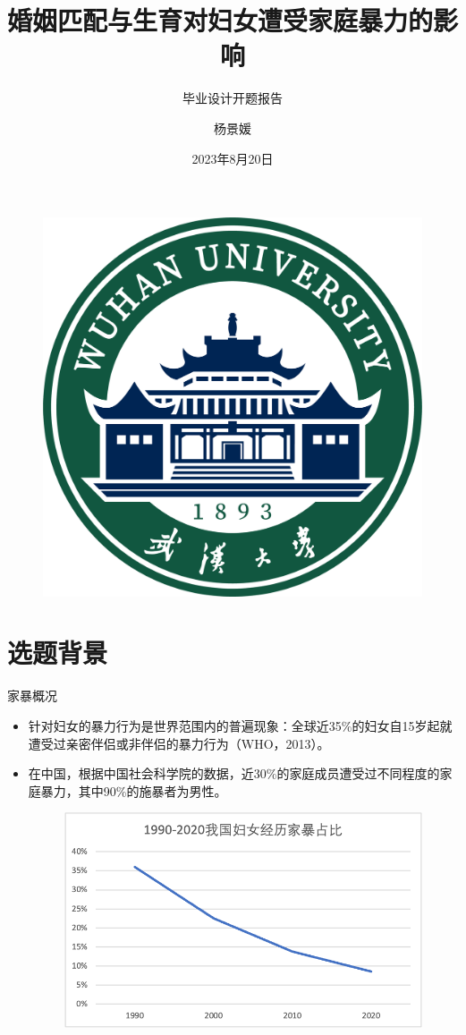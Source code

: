 \documentclass{beamer}
\author{杨景媛}
\title{婚姻匹配与生育对妇女遭受家庭暴力的影响}
\subtitle{毕业设计开题报告}
\institute{武汉大学经济与管理学院}
\date{2023年8月20日}
\begin{document}
\kaishu
\begin{frame}
    \titlepage
    \begin{figure}[htpb]
        \begin{center}
            \includegraphics[width=0.2\linewidth]{pic/whulogo.png}
        \end{center}
    \end{figure}
\end{frame}

\begin{frame}
    \tableofcontents[sectionstyle=show,subsectionstyle=show/shaded/hide,subsubsectionstyle=show/shaded/hide]
\end{frame}

\section{选题背景}
\begin{frame}{家暴概况}
    \begin{itemize}[<+-| alert@+>] 
        \item 针对妇女的暴力行为是世界范围内的普遍现象：全球近35\%的妇女自15岁起就遭受过亲密伴侣或非伴侣的暴力行为（WHO，2013）。
        \item 在中国，根据中国社会科学院的数据，近30\%的家庭成员遭受过不同程度的家庭暴力，其中90\%的施暴者为男性。
        \begin{figure}
            \includegraphics[scale=0.5]{历年家暴占比.png}
        \end{figure}
    \end{itemize}
\end{frame}
\end{document}
